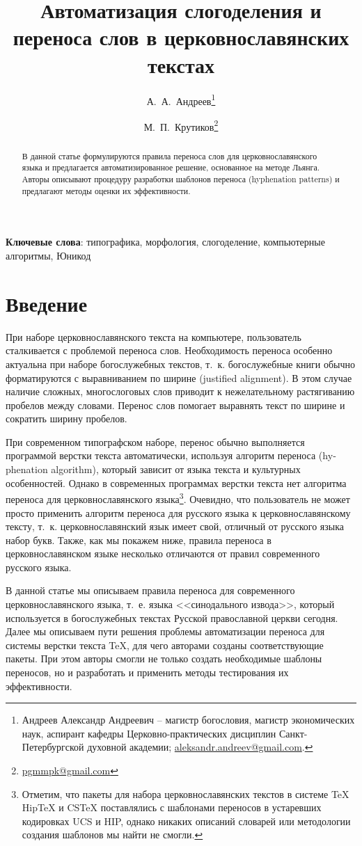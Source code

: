 \documentclass[12pt,a4paper,oneside]{extarticle}
\title{Автоматизация слогоделения и переноса слов в церковнославянских текстах}
\author{А.~А.~Андреев\thanks{Андреев Александр Андреевич -- магистр богословия, магистр экономических наук, аспирант кафедры Церковно-практических дисциплин Санкт-Петербургской духовной академии; \url{aleksandr.andreev@gmail.com}.} \and М.~П.~Крутиков\thanks{\url{pgmmpk@gmail.com}}}
\date{\vspace{-1em}}  %
\providecommand{\keywords}[1]{\textbf{Ключевые слова}: #1}
\begin{document}
\maketitle

\begin{abstract}
В данной статье формулируются правила переноса слов
для церковнославянского языка и предлагается автоматизированное решение,
основанное на методе Льянга. Авторы описывают процедуру разработки
шаблонов переноса (\textenglish{hyphenation patterns})
и предлагают методы оценки их эффективности.
\end{abstract}

\keywords{типографика, морфология, слогоделение, компьютерные алгоритмы, Юникод}

\section{Введение}

При наборе церковнославянского текста на компьютере, пользователь сталкивается с проблемой переноса слов. Необходимость переноса особенно актуальна при наборе богослужебных текстов, т.~к. богослужебные книги обычно форматируются с выравниванием по ширине (\textenglish{justified alignment}). В этом случае наличие сложных, многослоговых слов приводит к нежелательному растягиванию пробелов между словами. Перенос слов помогает выравнять текст по ширине и сократить ширину пробелов.

При современном типографском наборе, перенос обычно выполняется программой верстки текста автоматически, используя алгоритм переноса (\textenglish{hyphenation algorithm}), который зависит от языка текста и культурных особенностей. Однако в современных программах верстки текста нет алгоритма переноса для церковнославянского языка\footnote{Отметим, что пакеты для набора церковнославянских текстов в системе \TeX{} HipTeX и CSTeX поставлялись с шаблонами переносов в устаревших кодировках UCS и HIP, однако никаких описаний словарей или методологии создания шаблонов мы найти не смогли.}. Очевидно, что пользователь не может просто применить алгоритм переноса для русского языка к церковнославянскому тексту, т.~к. церковнославянский язык имеет свой, отличный от русского языка набор букв. Также, как мы покажем ниже, правила переноса в церковнославянском языке несколько отличаются от правил современного русского языка.

В данной статье мы описываем правила переноса для современного церковнославянского языка, т.~е. языка <<синодального извода>>, который используется в богослужебных текстах Русской православной церкви сегодня. Далее мы описываем пути решения проблемы автоматизации переноса для системы верстки текста \TeX{}, для чего авторами созданы соответствующие пакеты. При этом авторы смогли не только создать необходимые шаблоны переносов, но и разработать и применить методы тестирования их эффективности.
\end{document}
